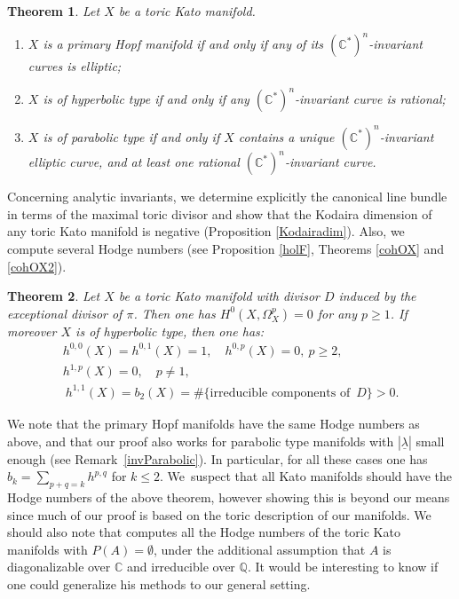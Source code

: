 \documentclass[JEP,XML,SOM,Unicode,NoFloatCountersInSection]{cedram}
\newtheorem{theorem}{Theorem}[section]
\theoremstyle{definition}
\let\sharp\#
\let\la\lambda
\let\un\underline
\newcommand{\CC}{\mathbb{C}}
\newcommand{\QQ}{\mathbb{Q}}
\begin{document}
\begin{theorem}
Let $X$ be a toric Kato manifold.
\begin{enumerate}
\item $X$ is a primary Hopf manifold if and only if any of its $(\CC^*)^n$-invariant curves is elliptic;
\item $X$ is of hyperbolic type if and only if any $(\CC^*)^n$-invariant curve is rational;
\item $X$ is of parabolic type if and only if $X$ contains a unique $(\CC^*)^n$-invariant elliptic curve, and at least one rational $(\CC^*)^n$-invariant curve.
\end{enumerate}
\end{theorem}

Concerning analytic invariants, we determine explicitly the canonical line bundle in terms of the maximal toric divisor and show that the Kodaira dimension of any toric Kato manifold is negative (Proposition \ref{Kodairadim}). Also, we compute several Hodge numbers (see Proposition \ref{holF}, Theorems \ref{cohOX} and \ref{cohOX2}).

\begin{theorem}
Let $X$ be a toric Kato manifold with divisor $D$ induced by the exceptional divisor of $\pi$. Then one has $H^0(X,\Omega_X^p)=0$ for any $p\geq 1$. If moreover $X$ is of hyperbolic type, then one has:
\begin{gather*}
h^{0,0}(X)=h^{0,1}(X)=1,\quad h^{0,p}(X)=0, \ p\geq 2,\\
h^{1,p}(X)=0, \quad p\neq 1,\\
\ h^{1,1}(X)=b_2(X)=\sharp \{ \text{irreducible components of }\, D\}>0.
\end{gather*}
\end{theorem}

We note that the primary Hopf manifolds have the same Hodge numbers as above, and that our proof also works for parabolic type manifolds with $|\un\la|$ small enough (see Remark~\ref{invParabolic}). In particular, for all these cases one has $b_k=\sum_{p+q=k}h^{p,q}$ for $k\leq 2$. We~suspect that all Kato manifolds should have the Hodge numbers of the above theorem, however showing this is beyond our means since much of our proof is based on the toric description of our manifolds. We should also note that \cite{san} computes all the Hodge numbers of the toric Kato manifolds with $P(A)=\emptyset$, under the additional assumption that $A$ is diagonalizable over $\CC$ and irreducible over $\QQ$. It would be interesting to know if one could generalize his methods to our general setting.
\end{document}

